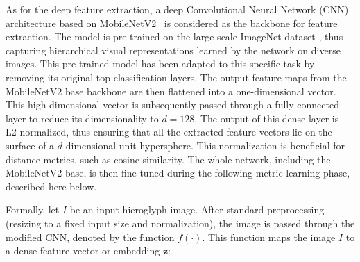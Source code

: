 \documentclass[10pt,onecolumn,letterpaper]{article}
\begin{document}
As for the deep feature extraction, a deep Convolutional Neural Network (CNN) architecture based on MobileNetV2~\cite{ sandler2018} is considered as the backbone for feature extraction. The model is pre-trained on the large-scale ImageNet dataset \cite{deng2009}, thus capturing hierarchical visual representations learned by the network on diverse images. This pre-trained model has been adapted to this specific task by removing its original top classification layers. The output feature maps from the MobileNetV2 base backbone are then flattened into a one-dimensional vector. This high-dimensional vector is subsequently passed through a fully connected layer to reduce its dimensionality to $d=128$. The output of this dense layer is L2-normalized, thus ensuring that all the extracted feature vectors lie on the surface of a $d$-dimensional unit hypersphere. This normalization is beneficial for distance metrics, such as cosine similarity. The whole network, including the MobileNetV2 base, is then fine-tuned during the following metric learning phase, described here below.



Formally, let $I$ be an input hieroglyph image. After standard preprocessing (resizing to a fixed input size and normalization), the image is passed through the modified CNN, denoted by the function $f(\cdot)$. This function maps the image $I$ to a dense feature vector or embedding $\mathbf{z}$:
\end{document}
